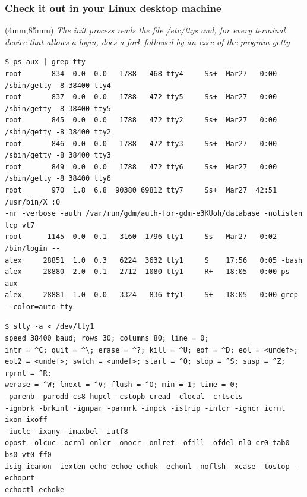 \documentclass[xcolor=dvipsnames,compress]{beamer}
\newenvironment{reference}[2]{%
  \begin{textblock*}{\textwidth}(#1,#2) 
      \tiny\it\bgroup\color{blue}}{\egroup\end{textblock*}}
\newcommand\Fontvi{\fontsize{6}{7.2}\selectfont}
\begin{document}
\begin{frame}[fragile]
\frametitle{Check it out in your Linux desktop machine} 
\begin{reference}{4mm}{85mm}
The init process reads the file /etc/ttys and, for every terminal device that allows a login, 
does a fork followed by an exec of the program getty
\end{reference} 
\Fontvi
\begin{verbatim}
$ ps aux | grep tty
root       834  0.0  0.0   1788   468 tty4     Ss+  Mar27   0:00 /sbin/getty -8 38400 tty4
root       837  0.0  0.0   1788   472 tty5     Ss+  Mar27   0:00 /sbin/getty -8 38400 tty5
root       845  0.0  0.0   1788   472 tty2     Ss+  Mar27   0:00 /sbin/getty -8 38400 tty2
root       846  0.0  0.0   1788   472 tty3     Ss+  Mar27   0:00 /sbin/getty -8 38400 tty3
root       849  0.0  0.0   1788   472 tty6     Ss+  Mar27   0:00 /sbin/getty -8 38400 tty6
root       970  1.8  6.8  90380 69812 tty7     Ss+  Mar27  42:51 /usr/bin/X :0 
-nr -verbose -auth /var/run/gdm/auth-for-gdm-e3KUoh/database -nolisten tcp vt7
root      1145  0.0  0.1   3160  1796 tty1     Ss   Mar27   0:02 /bin/login --     
alex     28851  1.0  0.3   6224  3632 tty1     S    17:56   0:05 -bash
alex     28880  2.0  0.1   2712  1080 tty1     R+   18:05   0:00 ps aux
alex     28881  1.0  0.0   3324   836 tty1     S+   18:05   0:00 grep --color=auto tty
\end{verbatim}
\pause
\begin{verbatim}
$ stty -a < /dev/tty1
speed 38400 baud; rows 30; columns 80; line = 0;
intr = ^C; quit = ^\; erase = ^?; kill = ^U; eof = ^D; eol = <undef>;
eol2 = <undef>; swtch = <undef>; start = ^Q; stop = ^S; susp = ^Z; rprnt = ^R;
werase = ^W; lnext = ^V; flush = ^O; min = 1; time = 0;
-parenb -parodd cs8 hupcl -cstopb cread -clocal -crtscts
-ignbrk -brkint -ignpar -parmrk -inpck -istrip -inlcr -igncr icrnl ixon ixoff
-iuclc -ixany -imaxbel -iutf8
opost -olcuc -ocrnl onlcr -onocr -onlret -ofill -ofdel nl0 cr0 tab0 bs0 vt0 ff0
isig icanon -iexten echo echoe echok -echonl -noflsh -xcase -tostop -echoprt
echoctl echoke
\end{verbatim}
\end{frame}
\end{document}
